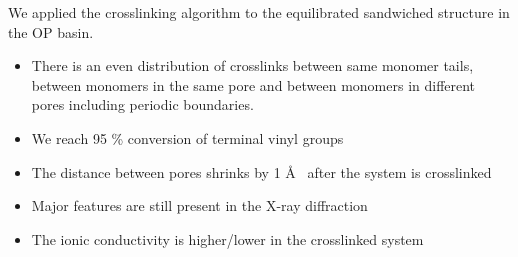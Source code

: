 \documentclass{article}
\newcommand{\angstrom}{\textup{\AA}}
\begin{document}
  We applied the crosslinking algorithm to the equilibrated sandwiched structure in 
  the OP basin.
  \begin{itemize}  %
  	\item There is an even distribution of crosslinks between same monomer tails, 
	between monomers in the same pore and between monomers in different pores 
	including periodic boundaries.
	\item We reach 95 \% conversion of terminal vinyl groups
	\item The distance between pores shrinks by 1 \angstrom~ after the system is 
	crosslinked
	\item Major features are still present in the X-ray diffraction
	\item The ionic conductivity is higher/lower in the crosslinked system
  \end{itemize}
\end{document}
